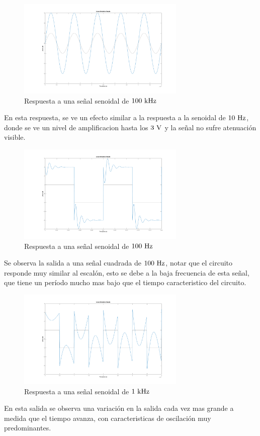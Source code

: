 \begin{figure}[!h]
	\centering
	\includegraphics[width=8cm]{imagenes/rtasen100k}	\caption{Respuesta a una señal senoidal de $100\ \si{\kilo\hertz}$}	
\end{figure}
En esta respuesta, se ve un efecto similar a la respuesta a la senoidal de $10\ \si{\hertz}$, donde se ve un nivel de  amplificacion hasta los $3\ \si{\volt}$ y la  señal no sufre atenuaci\'on visible.\\

\begin{figure}[hbt]
	\centering
	\includegraphics[width=8cm]{imagenes/rtasqar100}	\caption{Respuesta a una señal senoidal de $100\ \si{\hertz}$}	
\end{figure}

Se observa la salida a una señal cuadrada de $100 \ \si{\hertz}$, notar que el circuito responde muy similar al escal\'on, esto se debe a la baja frecuencia de esta señal, que tiene un per\'iodo mucho mas bajo que el tiempo caracteristico del circuito.

\begin{figure}[hbt]
	\centering
	\includegraphics[width=8cm]{imagenes/rtasqar1k}	\caption{Respuesta a una señal senoidal de $1\ \si{\kilo\hertz}$}	
\end{figure}
En esta salida se observa una variaci\'on en la salida cada vez mas grande a medida que el tiempo avanza, con caracteristicas de oscilaci\'on muy predominantes.\\

